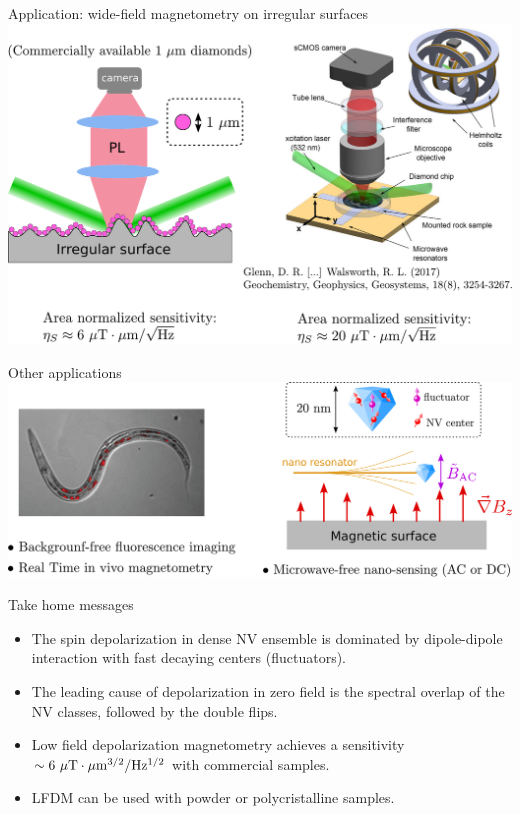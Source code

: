 \documentclass{beamer}
\begin{document}
\begin{frame}{Application: wide-field magnetometry on irregular surfaces}
\centering
\includegraphics[width=\textwidth,height=0.9\textheight,keepaspectratio]{Slide_applications_wide_field}
\end{frame}

\begin{frame}{Other applications}
\centering
\includegraphics[width=\textwidth,height=0.9\textheight,keepaspectratio]{Slide_application_autre}
\end{frame}

\begin{frame}{Take home messages}
\begin{itemize}
\item The spin depolarization in dense NV ensemble is dominated by dipole-dipole interaction with fast decaying centers (fluctuators).
\medskip
\item The leading cause of depolarization in zero field is the spectral overlap of the NV classes, followed by the double flips.
\medskip
\item Low field depolarization magnetometry achieves a sensitivity $\sim 6\ \mu\rm T \cdot \mu \rm m^{3/2} / Hz^{1/2}$ with commercial samples.
\medskip
\item LFDM can be used with powder or polycristalline samples.
\end{itemize}

\end{frame}

%
\end{document}
